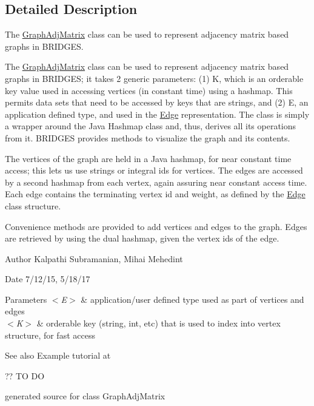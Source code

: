 \subsection{Detailed Description}
The \hyperlink{class_graph_adj_matrix_1_1_graph_adj_matrix}{Graph\+Adj\+Matrix} class can be used to represent adjacency matrix based graphs in B\+R\+I\+D\+G\+ES. 

The \hyperlink{class_graph_adj_matrix_1_1_graph_adj_matrix}{Graph\+Adj\+Matrix} class can be used to represent adjacency matrix based graphs in B\+R\+I\+D\+G\+ES; it takes 2 generic parameters\+: (1) K, which is an orderable key value used in accessing vertices (in constant time) using a hashmap. This permits data sets that need to be accessed by keys that are strings, and (2) E, an application defined type, and used in the \hyperlink{namespace_edge}{Edge} representation. The class is simply a wrapper around the Java Hashmap class and, thus, derives all its operations from it. B\+R\+I\+D\+G\+ES provides methods to visualize the graph and its contents.

The vertices of the graph are held in a Java hashmap, for near constant time access; this lets us use strings or integral ids for vertices. The edges are accessed by a second hashmap from each vertex, again assuring near constant access time. Each edge contains the terminating vertex id and weight, as defined by the \hyperlink{namespace_edge}{Edge} class structure.

Convenience methods are provided to add vertices and edges to the graph. Edges are retrieved by using the dual hashmap, given the vertex ids of the edge.

\begin{DoxyAuthor}{Author}
Kalpathi Subramanian, Mihai Mehedint
\end{DoxyAuthor}
\begin{DoxyDate}{Date}
7/12/15, 5/18/17
\end{DoxyDate}

\begin{DoxyParams}{Parameters}
{\em $<$\+E$>$} & application/user defined type used as part of vertices and edges \\
\hline
{\em $<$\+K$>$} & orderable key (string, int, etc) that is used to index into vertex structure, for fast access\\
\hline
\end{DoxyParams}
\begin{DoxySeeAlso}{See also}
Example tutorial at 
\end{DoxySeeAlso}
?? TO DO\begin{DoxyVerb}generated source for class GraphAdjMatrix \end{DoxyVerb}
 

